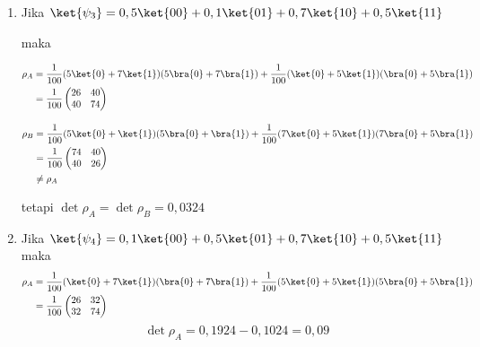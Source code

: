\begin{enumerate}
	diperoleh $\rho_{A1}\neq\rho_{A2}$ tetapi $\det\rho_{A1}=\det\rho_{A2}$.
	
	\item Jika $
	\ket{\psi_3}=0,5\ket{00}+0,1\ket{01}+0,7\ket{10}+0,5\ket{11}$
	
	maka
	
	\begin{equation}
		\begin{aligned}
			\rho_A
			&=\frac{1}{100}(5\ket{0}+7\ket{1})(5\bra{0}+7\bra{1})+\frac{1}{100}(\ket{0}+5\ket{1})(\bra{0}+5\bra{1})\\
			&=\frac{1}{100}
			\begin{pmatrix}
				26&40\\
				40&74
			\end{pmatrix}
		\end{aligned}
	\end{equation}
	
	\begin{equation}
		\begin{aligned}
			\rho_B
			&=\frac{1}{100}(5\ket{0}+\ket{1})(5\bra{0}+\bra{1})+\frac{1}{100}(7\ket{0}+5\ket{1})(7\bra{0}+5\bra{1})\\
			&=\frac{1}{100}
			\begin{pmatrix}
				74&40\\
				40&26
			\end{pmatrix}\\
			&\neq\rho_A
		\end{aligned}
	\end{equation}
	
	tetapi $\det\rho_A=\det\rho_B=0,0324$
	
	\item Jika $
	\ket{\psi_4}=0,1\ket{00}+0,5\ket{01}+0,7\ket{10}+0,5\ket{11}$
	maka
	\begin{equation}
		\begin{aligned}
			\rho_A
			&=\frac{1}{100}(\ket{0}+7\ket{1})(\bra{0}+7\bra{1})+\frac{1}{100}(5\ket{0}+5\ket{1})(5\bra{0}+5\bra{1})\\
			&=\frac{1}{100}
			\begin{pmatrix}
				26&32\\
				32&74
			\end{pmatrix}
		\end{aligned}
	\end{equation}
	\begin{equation}
		\det\rho_{A}=0,1924-0,1024=0,09
	\end{equation}
	

\end{enumerate}
